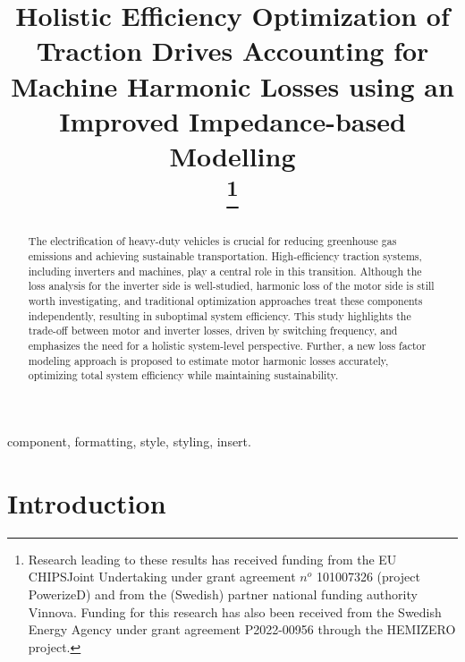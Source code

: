 \documentclass[conference]{IPEC2026}
\begin{document}
\title{Holistic Efficiency Optimization of Traction Drives Accounting for Machine Harmonic Losses using an Improved Impedance-based Modelling
\\
\thanks{Research leading to these results has received funding from the EU CHIPSJoint Undertaking under grant agreement $n^o$ 101007326 (project PowerizeD) and from the (Swedish) partner national funding authority Vinnova. Funding for this research has also been received from the Swedish Energy Agency under grant agreement P2022-00956 through the HEMIZERO project.
}
}



\maketitle

\begin{abstract}
The electrification of heavy-duty vehicles is crucial for reducing greenhouse gas emissions and achieving sustainable transportation. High-efficiency traction systems, including inverters and machines, play a central role in this transition. 
Although the loss analysis for the inverter side is well-studied, harmonic loss of the motor side is still worth investigating, and traditional optimization approaches treat these components independently, resulting in suboptimal system efficiency.
This study highlights the trade-off between motor and inverter losses, driven by switching frequency, and emphasizes the need for a holistic system-level perspective. 
Further, a new loss factor modeling approach is proposed to estimate motor harmonic losses accurately, optimizing total system efficiency while maintaining sustainability.
\end{abstract}

\begin{IEEEkeywords}
component, formatting, style, styling, insert.
\end{IEEEkeywords}

\section{Introduction}
\end{document}
